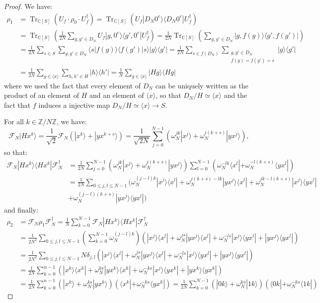 \documentclass[a4paper,10pt]{report}
\theoremstyle{definition}
\theoremstyle{plain}
\theoremstyle{definition}
\newcommand{\Z}{\mathbb{Z}}
\newcommand{\C}{\mathbb{C}}
\newcommand{\m}[1]{\mathcal{#1}}
\renewcommand{\(}{\left(}
\renewcommand{\)}{\right)}
\DeclareMathOperator{\Tr}{Tr}
\begin{document}
\begin{proof}
We have:
\begin{align*}
\rho_1&=\Tr_{\C[S]}(U_f\cdot \rho_0\cdot U_f^{\dag})=\Tr_{\C[S]}(U_f|D_N0^e\rangle\langle D_N 0^e|U_f^{\dag})\\
&=\Tr_{\C[S]}\(\frac{1}{2N}\sum_{g,g'\in D_N}U_f|g,0^e\rangle\langle g',0^e|U_f^{\dag}\)=\frac{1}{2N}\Tr_{\C[S]}\(\sum_{g,g'\in D_N}|g,f(g)\rangle\langle g',f(g')|\)\\
&=\frac{1}{2N}\sum_{s\in S}\sum_{g,g'\in D_N}\langle s|f(g)\rangle \langle f(g')|s\rangle |g\rangle\langle g'|=\frac{1}{2N}\sum_{s\in f(D_N)}\sum_{\substack{g,g'\in D_N\\f(g)=f(g')=s}}|g\rangle\langle g'|\\
&=\frac{1}{2N}\sum_{g\in \langle x\rangle}\sum_{h,h'\in H}|h\rangle\langle h'|=\frac{1}{N}\sum_{g\in \langle x\rangle}|Hg\rangle\langle Hg|
\end{align*}
where we used the fact that every element of $D_N$ can be uniquely written as the product of an element of $H$ and an element of $\langle x\rangle$, so that $D_N/H\simeq \langle x\rangle$ and the fact that $f$ induces a injective map $D_N/H\simeq \langle x\rangle\longrightarrow S$.

For all $k\in\Z/N\Z$, we have:
\[\m{F}_N|Hx^k\rangle=\frac{1}{\sqrt{2}}\m{F}_N(|x^k\rangle+|yx^{k+s}\rangle)=\frac{1}{\sqrt{2N}}\sum_{j=0}^{N-1}(\omega_N^{jk}|x^j\rangle+\omega_N^{j(k+s)}|yx^j\rangle),\]
so that:
\begin{align*}
\m{F}_N|Hx^k\rangle\langle Hx^k|\m{F}_N^{\dag}&=\frac{1}{2N}\sum_{j=0}^{N-1}(\omega_N^{jk}|x^j\rangle+\omega_N^{j(k+s)}|yx^j\rangle)\sum_{l=0}^{N-1}(\omega_N^{-lk}\langle x^l|+\omega_N^{-l(k+s)}\langle yx^l|)\\
&=\frac{1}{2N}\sum_{0\leq j,l\leq N-1}(\omega_N^{(j-l)k}|x^j\rangle\langle x^l|+\omega_N^{j(k+s)-lk}|yx^j\rangle\langle x^l|+\omega_N^{jk-l(k+s)}|x^j\rangle\langle yx^l|\\
&+\omega_N^{(j-l)(k+s)}|yx^j\rangle\langle yx^l|)
\end{align*}
and finally:
\begin{align*}
\rho_2&=\m{F}_N\rho_1\m{F}_N^{\dag}=\frac{1}{N}\sum_{k=0}^{N-1}\m{F}_N|Hx^k\rangle\langle Hx^k|\m{F}_N^{\dag}\\
&=\frac{1}{2N^2}\sum_{0\leq j,l\leq N-1}\(\sum_{k=0}^{N-1}\omega_N^{(j-l)k}\)\(|x^j\rangle\langle x^l|+\omega_N^{js}|yx^j\rangle\langle x^l|+\omega_N^{-ls}|x^j\rangle\langle yx^l|+|yx^j\rangle\langle yx^l|\)\\
&=\frac{1}{2N^2}\sum_{0\leq j,l\leq N-1}N\delta_{j,l}\(|x^j\rangle\langle x^l|+\omega_N^{js}|yx^j\rangle\langle x^l|+\omega_N^{-ls}|x^j\rangle\langle yx^l|+|yx^j\rangle\langle yx^l|\)\\
&=\frac{1}{2N}\sum_{k=0}^{n-1}\(|x^k\rangle\langle x^k|+\omega_N^{ks}|yx^k\rangle\langle x^k|+\omega_N^{-ks}|x^j\rangle\langle yx^k|+|yx^k\rangle\langle yx^k|\)\\
&=\frac{1}{2N}\sum_{k=0}^{n-1}(|x^k\rangle +\omega_N^{ks}|yx^k\rangle)(\langle x^k|+\omega_N^{-ks}\langle yx^k|)=\frac{1}{2N}\sum_{k=0}^{N-1}(|0k\rangle +\omega_N^{ks}|1k\rangle)(\langle 0k|+\omega_N^{-ks}\langle 1k|)
\end{align*}


\end{proof}
\end{document}
